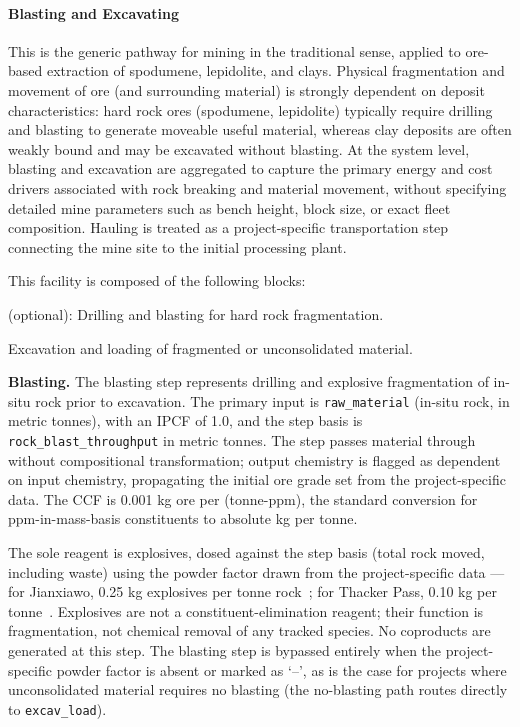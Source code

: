 \paragraph{Blasting and Excavating}\label{app:04-methods-facilitychoices-blastexcav}

This is the generic pathway for mining in the traditional sense, applied to ore-based extraction of spodumene, lepidolite, and clays. Physical fragmentation and movement of ore (and surrounding material) is strongly dependent on deposit characteristics: hard rock ores (spodumene, lepidolite) typically require drilling and blasting to generate moveable useful material, whereas clay deposits are often weakly bound and may be excavated without blasting. At the system level, blasting and excavation are aggregated to capture the primary energy and cost drivers associated with rock breaking and material movement, without specifying detailed mine parameters such as bench height, block size, or exact fleet composition. Hauling is treated as a project-specific transportation step connecting the mine site to the initial processing plant.

This facility is composed of the following blocks:

\begin{description}[noitemsep, topsep=0pt]
    \item[\textbullet\enskip\texttt{Blasting}] (optional): Drilling and blasting for hard rock fragmentation.
    \item[\textbullet\enskip\texttt{Excavation/Loading:}] Excavation and loading of fragmented or unconsolidated material.
\end{description}

\medskip
\noindent\textbf{Blasting.}\quad
The blasting step represents drilling and explosive fragmentation of in-situ rock prior to excavation. The primary input is \texttt{raw\_material} (in-situ rock, in metric tonnes), with an IPCF of 1.0, and the step basis is \texttt{rock\_blast\_throughput} in metric tonnes. The step passes material through without compositional transformation; output chemistry is flagged as dependent on input chemistry, propagating the initial ore grade set from the project-specific data. The CCF is 0.001 kg ore per (tonne-ppm), the standard conversion for ppm-in-mass-basis constituents to absolute kg per tonne.

The sole reagent is explosives, dosed against the step basis (total rock moved, including waste) using the powder factor drawn from the project-specific data --- for Jianxiawo, 0.25 kg explosives per tonne rock~\cite{darlingSMEMiningEngineering2011}; for Thacker Pass, 0.10 kg per tonne~\cite{sgscanadaincSK1300Technical2024}. Explosives are not a constituent-elimination reagent; their function is fragmentation, not chemical removal of any tracked species. No coproducts are generated at this step. The blasting step is bypassed entirely when the project-specific powder factor is absent or marked as `--', as is the case for projects where unconsolidated material requires no blasting (the no-blasting path routes directly to \texttt{excav\_load}).

